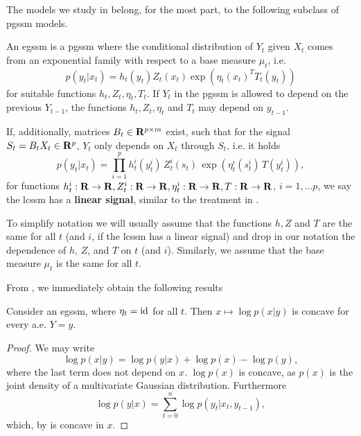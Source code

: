 The models we study in  belong, for the most part,  to the following subclass of \acrshort{pgssm} models.
\begin{definition}
    \label{def:lcssm}
    An \acrfull{egssm} is a \acrshort{pgssm} where the conditional distribution of $Y_{t}$ given $X_{t}$ comes from an exponential family with respect to a base measure $\mu_{t}$, i.e.
    $$
    p (y_{t}|x_{t}) = h_{t}(y_{t}) Z_{t}(x_{t}) \exp \left( \eta_{t}(x_{t})^{T} T_{t}(y_{t}) \right)
    $$
    for suitable functions $h_{t}, Z_{t}, \eta_{t}, T_{t}$. If $Y_{t}$ in the \acrshort{pgssm} is allowed to depend on the previous $Y_{t - 1}$, the functions $h_{t}, Z_{t}, \eta_{t}$ and $T_{t}$ may depend on $y_{t - 1}$. 

    If, additionally, matrices $B_{t} \in \mathbf R^{p \times m}$ exist, such that for the signal $S_{t} = B_{t}X_{t} \in \mathbf R^{p}$, $Y_{t}$ only depends on $X_{t}$ through $S_{t}$, i.e. it holds
    $$
    p(y_{t}|x_{t}) = \prod_{i = 1}^p h^{i}_{t}(y^{i}_{t})\, Z^{i}_{t} (s_{t})\, \exp \left( \eta^{i}_{t} (s^{i}_{t})\,T(y^{i}_{t}) \right),
    $$
    for functions $h_{t}^{i}: \mathbf R \to \mathbf R, Z^{i}_{t}: \mathbf R \to \mathbf R, \eta^{i}_{t}: \mathbf R\to\mathbf R, T: \mathbf R\to\mathbf R$, $i = 1, \dots p$, we say the \gls{lcssm} has a \textbf{linear signal}, similar to the treatment in \citep[Part II]{Durbin2012Time}.
\end{definition}

\begin{remark}
    To simplify notation we will usually assume that the functions $h, Z$ and $T$ are the same for all $t$ (and $i$, if the \gls{lcssm} has a linear signal) and drop in our notation the dependence of $h$, $Z$, and $T$ on $t$ (and $i$). Similarly, we assume that the base measure $\mu_t$ is the same for all $t$.
\end{remark}

From , we immediately obtain the following results \citep[Section 10.6.4]{Durbin2012Time}
\begin{lemma}
    Consider an \acrshort{egssm}, where $\eta_{t} = \operatorname{id}$ for all $t$.  Then $x \mapsto \log p(x|y)$ is concave for every a.e. $Y = y$. 
\end{lemma}
\begin{proof}
    We may write
    $$
    \log p(x|y) = \log p(y|x) + \log p(x) - \log p(y),
    $$
    where the last term does not depend on $x$. $\log p(x)$ is concave, as $p(x)$ is the joint density of a multivariate Gaussian distribution. Furthermore 
    $$
    \log p(y | x) = \sum_{t = 0}^n \log p(y_{t} | x_{t}, y_{t - 1}),
    $$
    which, by  is concave in $x$. 
\end{proof}

